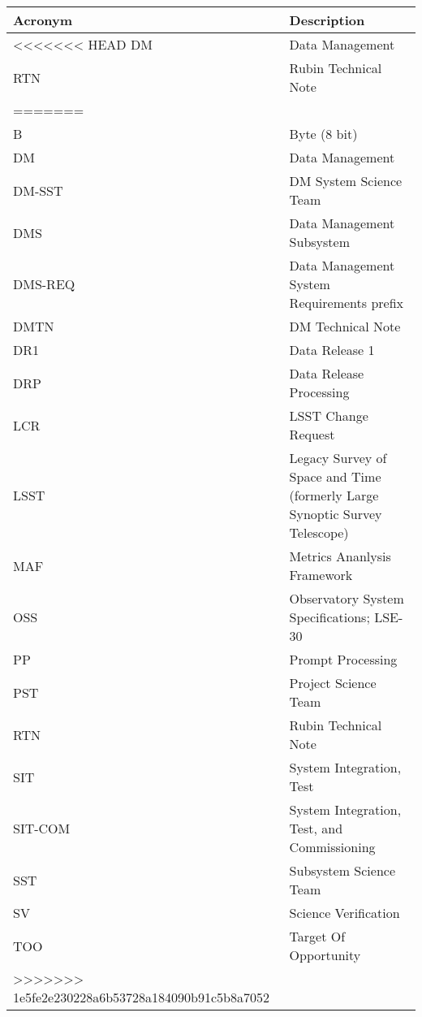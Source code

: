 \addtocounter{table}{-1}
\begin{longtable}{p{}p{}}\hline
\textbf{Acronym} & \textbf{Description}  \\\hline

<<<<<<< HEAD
DM & Data Management \\\hline
RTN & Rubin Technical Note \\\hline
=======
 &  \\\hline
B & Byte (8 bit) \\\hline
DM & Data Management \\\hline
DM-SST & DM System Science Team \\\hline
DMS & Data Management Subsystem \\\hline
DMS-REQ & Data Management System Requirements prefix \\\hline
DMTN & DM Technical Note \\\hline
DR1 & Data Release 1 \\\hline
DRP & Data Release Processing \\\hline
LCR & LSST Change Request \\\hline
LSST & Legacy Survey of Space and Time (formerly Large Synoptic Survey Telescope) \\\hline
MAF & Metrics Ananlysis Framework \\\hline
OSS & Observatory System Specifications; LSE-30 \\\hline
PP & Prompt Processing \\\hline
PST & Project Science Team \\\hline
RTN & Rubin Technical Note \\\hline
SIT & System Integration, Test \\\hline
SIT-COM & System Integration, Test, and Commissioning \\\hline
SST & Subsystem Science Team \\\hline
SV & Science Verification \\\hline
TOO & Target Of Opportunity \\\hline
>>>>>>> 1e5fe2e230228a6b53728a184090b91c5b8a7052
\end{longtable}

